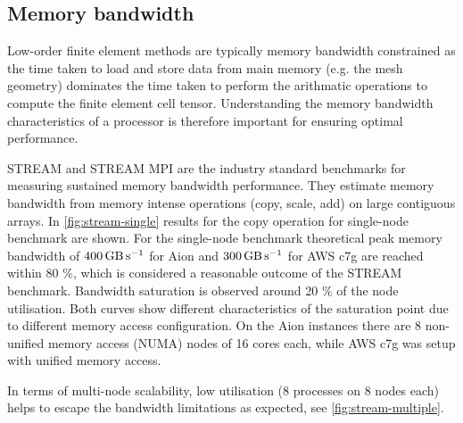\subsection*{Memory bandwidth}

Low-order finite element methods are typically memory bandwidth constrained as
the time taken to load and store data from main memory (e.g. the mesh geometry)
dominates the time taken to perform the arithmatic operations to compute the
finite element cell tensor. Understanding the memory bandwidth characteristics
of a processor is therefore important for ensuring optimal performance.

STREAM and STREAM MPI \citep{McCalpin1995,McCalpin2007} are the industry
standard benchmarks for measuring sustained memory bandwidth performance. They
estimate memory bandwidth from memory intense operations (copy, scale, add) on
large contiguous arrays. In \autoref{fig:stream-single} results for the
copy operation for single-node benchmark are shown. For the single-node
benchmark theoretical peak memory bandwidth of
$\SI{400}{\giga\byte\per\second}$ for Aion and
$\SI{300}{\giga\byte\per\second}$ for AWS c7g are reached within 80 \%, which
is considered a reasonable outcome of the STREAM benchmark. Bandwidth
saturation is observed around 20 \% of the node utilisation. Both curves show
different characteristics of the saturation point due to different memory
access configuration. On the Aion instances there are 8 non-unified memory
access (NUMA) nodes of 16 cores each, while AWS c7g was setup with unified
memory access.

In terms of multi-node scalability, low utilisation (8 processes on 8 nodes
each) helps to escape the bandwidth limitations as expected, see
\autoref{fig:stream-multiple}.

